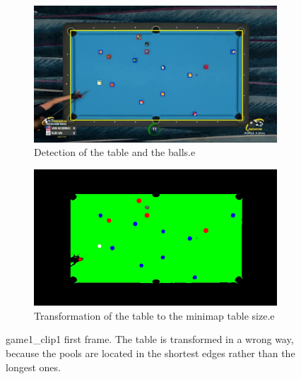 \begin{figure}[H]
	\centering
	\begin{subfigure}[b]{0.35\textwidth}
		\centering
		\includegraphics[width=\textwidth]{images/TableOrientation/g1_c1.jpg}
		\caption{Detection of the table and the balls.e}
	\end{subfigure}
	\begin{subfigure}[b]{0.35\textwidth}
		\centering
		\includegraphics[width=\textwidth]{images/Segmentation/game1_clip1_segmented_balls_first_frame.jpg}
		\caption{Transformation of the table to the minimap table size.e}
	\end{subfigure}
	\caption{game1\_clip1 first frame. The table is transformed in a wrong way, because the pools are located in the shortest edges rather than the longest ones.}
	\label{fig:game1_clip1_orientation}
\end{figure}

